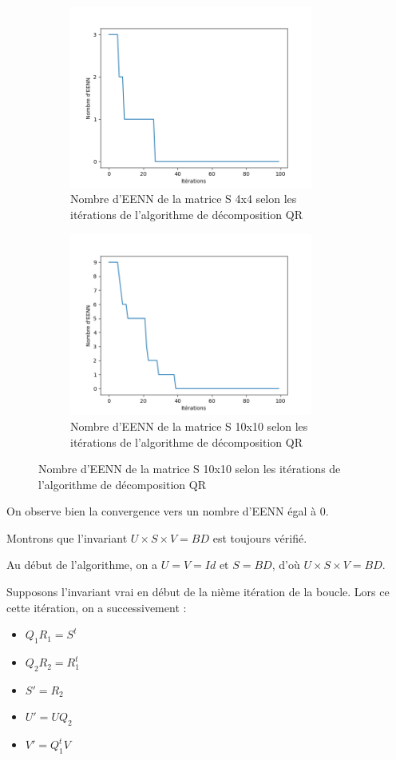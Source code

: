 \documentclass{article}
\begin{document}
\begin{figure}[!htb]
  \centering
  \begin{subfigure}[b]{\linewidth}
    \includegraphics[width=8cm]{../files/conv_diag_4x4.png}
    \caption{Nombre d'EENN de la matrice S 4x4 selon les itérations de l'algorithme de décomposition QR}
    \label{subfig:4x4_conv_diag}
  \end{subfigure}
  \hfill
  \begin{subfigure}[b]{\linewidth}
    \includegraphics[width=8cm]{../files/conv_diag_10x10.png}
    \caption{Nombre d'EENN de la matrice S 10x10 selon les itérations de l'algorithme de décomposition QR}
    \label{subfig:10x10_grad_prcd}
  \end{subfigure}
\end{figure}

On observe bien la convergence vers un nombre d'EENN égal à 0.

\bigskip

Montrons que l'invariant $U \times S \times V = BD$ est toujours vérifié.

Au début de l'algorithme, on a $U = V = Id$ et $S = BD$, d'où $U \times S \times V = BD$.

Supposons l'invariant vrai en début de la nième itération de la boucle. Lors ce cette itération, on a successivement :

\begin{itemize}
\item $Q_1R_1 = S^t$
\item $Q_2R_2 = R_1^t$
\item $S' = R_2$
\item $U' = UQ_2$
\item $V' = Q_1^tV$
\end{itemize}
\end{document}
